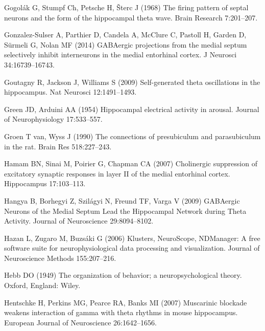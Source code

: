 \documentclass[
  12pt,
  a4paper,
  openany]{book}
\newlength{\cslhangindent}
\newlength{\cslentryspacingunit} %
\newenvironment{CSLReferences}[2] %
 {%
  \setlength{\parindent}{0pt}
  \ifodd #1
  \let\oldpar\par
  \def\par{\hangindent=\cslhangindent\oldpar}
  \fi
  \setlength{\parskip}{#2\cslentryspacingunit}
 }%
 {}
\begin{document}
\begin{CSLReferences}{1}{0}
\leavevmode{}%
Gogolák G, Stumpf Ch, Petsche H, Šterc J (1968) The firing pattern of septal neurons and the form of the hippocampal theta wave. Brain Research 7:201--207.

\leavevmode{}%
Gonzalez-Sulser A, Parthier D, Candela A, McClure C, Pastoll H, Garden D, Sürmeli G, Nolan MF (2014) {GABAergic} projections from the medial septum selectively inhibit interneurons in the medial entorhinal cortex. J Neurosci 34:16739--16743.

\leavevmode{}%
Goutagny R, Jackson J, Williams S (2009) Self-generated theta oscillations in the hippocampus. Nat Neurosci 12:1491--1493.

\leavevmode{}%
Green JD, Arduini AA (1954) Hippocampal electrical activity in arousal. Journal of Neurophysiology 17:533--557.

\leavevmode{}%
Groen T van, Wyss J (1990) The connections of presubiculum and parasubiculum in the rat. Brain Res 518:227--243.

\leavevmode{}%
Hamam BN, Sinai M, Poirier G, Chapman CA (2007) Cholinergic suppression of excitatory synaptic responses in layer {II} of the medial entorhinal cortex. Hippocampus 17:103--113.

\leavevmode{}%
Hangya B, Borhegyi Z, Szilágyi N, Freund TF, Varga V (2009) {GABAergic} {Neurons} of the {Medial} {Septum} {Lead} the {Hippocampal} {Network} during {Theta} {Activity}. Journal of Neuroscience 29:8094--8102.

\leavevmode{}%
Hazan L, Zugaro M, Buzsáki G (2006) Klusters, {NeuroScope}, {NDManager}: {A} free software suite for neurophysiological data processing and visualization. Journal of Neuroscience Methods 155:207--216.

\leavevmode{}%
Hebb DO (1949) The organization of behavior; a neuropsychological theory. Oxford, England: Wiley.

\leavevmode{}%
Hentschke H, Perkins MG, Pearce RA, Banks MI (2007) Muscarinic blockade weakens interaction of gamma with theta rhythms in mouse hippocampus. European Journal of Neuroscience 26:1642--1656.


\end{CSLReferences}
\end{document}

